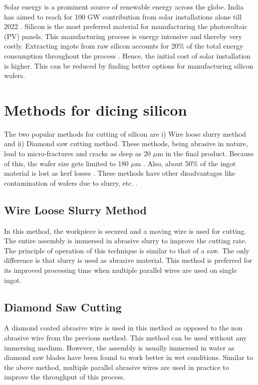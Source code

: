 \label{chap:introduction}
	Solar energy is a prominent source of renewable energy across the globe. India has aimed to reach for 100 GW contribution from solar installations alone till 2022 \cite{mnreReport}. Silicon is the most preferred material for manufacturing the photovoltaic (PV) panels. This manufacturing process is energy intensive and thereby very costly. Extracting ingots from raw silicon accounts for 20\% of the total energy consumption throughout the process \cite{del09}. Hence, the initial cost of solar installation is higher. This can be reduced by finding better options for manufacturing silicon wafers.

\section{Methods for dicing silicon}
	The two popular methods for cutting of silicon are i) Wire loose slurry method and ii) Diamond saw cutting method. These methods, being abrasive in nature, lead to micro-fractures and cracks as deep as 20 $\mu$m in the final product. Because of this, the wafer size gets limited to 180 $\mu$m \cite{sopori13}. Also, about 50\% of the ingot material is lost as kerf losses \cite{joshi10}. These methods have other disadvantages like contamination of wafers due to slurry, etc. \cite{moeller2015}.

\subsection{Wire Loose Slurry Method}
	In this method, the workpiece is secured and a moving wire is used for cutting. The entire assembly is immersed in abrasive slurry to improve the cutting rate. The principle of operation of this technique is similar to that of a saw. The only difference is that slurry is used as abrasive material. This method is preferred for its improved processing time when multiple parallel wires are used on single ingot.

\subsection{Diamond Saw Cutting}
	A diamond coated abrasive wire is used in this method as opposed to the non abrasive wire from the previous method. This method can be used without any immersing medium. However, the assembly is usually immersed in water as diamond saw blades have been found to work better in wet conditions. Similar to the above method, multiple parallel abrasive wires are used in practice to improve the throughput of this process.

